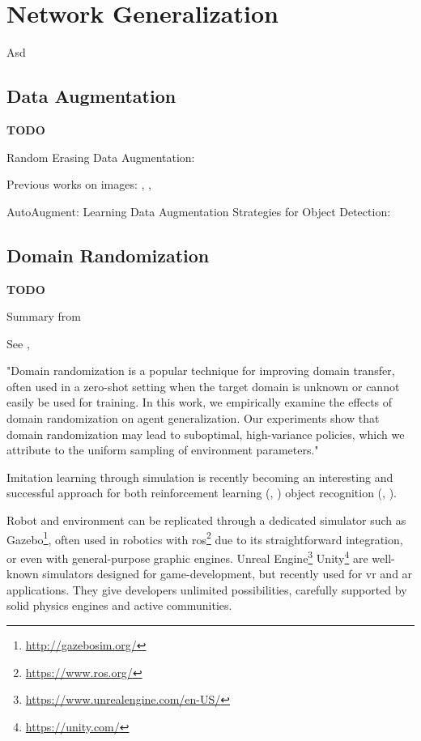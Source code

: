 \section{Network Generalization}
\label{sec:network-generalization}

Asd



\subsection{Data Augmentation}
\label{subsec:data-augmentation}

\textbf{TODO}

Random Erasing Data Augmentation: \cite{zhong2017random}

Previous works on images:  \cite{yue2019domain}, \cite{Takahashi_2020}, \cite{xie2020unsupervised}

AutoAugment: \cite{cubuk2019autoaugment}
Learning Data Augmentation Strategies for Object Detection: \cite{zoph2019learning}



\subsection{Domain Randomization}
\label{subsec:domain-randomization}

\textbf{TODO}

Summary from \cite{mehta2019active}

See \cite{weng2019DR_explanation}, \cite{tobin2017domain}
 
"Domain randomization is a popular technique for improving domain transfer, often used in a zero-shot setting when the target domain is unknown or cannot easily be used for training. In this work, we empirically examine the effects of domain randomization on agent generalization. Our experiments show that domain randomization may lead to suboptimal, high-variance policies, which we attribute to the uniform sampling of environment parameters."

\medskip

Imitation learning through simulation is recently becoming an interesting and successful approach for both reinforcement learning (\cite{imitation_learning_survey}, \cite{imitation_learning_3d_navigation}) object recognition (\cite{tobin2017domain}, \cite{weng2019DR}).

Robot and environment can be replicated through a dedicated simulator such as Gazebo\footnote{\url{http://gazebosim.org/}}, often used in robotics with \gls{ros}\footnote{\url{https://www.ros.org/}} due to its straightforward integration, or even with general-purpose graphic engines. Unreal Engine\footnote{\url{https://www.unrealengine.com/en-US/}} Unity\footnote{\url{https://unity.com/}} are well-known simulators designed for game-development, but recently used for \gls{vr} and \gls{ar} applications. They give developers unlimited possibilities, carefully supported by solid physics engines and active communities.

